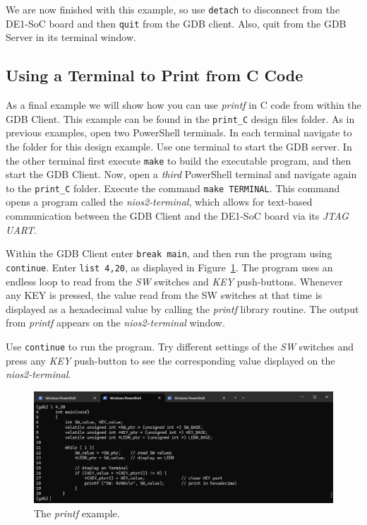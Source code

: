 \documentclass[11pt, twoside, pdftex]{article}
\begin{document}
We are now finished with this example, so use \texttt{detach} to disconnect from the DE1-SoC 
board and then \texttt{quit} from the GDB client. Also, quit from the GDB Server in its 
terminal window. 

\subsection{Using a Terminal to Print from C Code}

As a final example we will show how you can use {\it printf} in C code from within the GDB 
Client.  This example can be found in the \texttt{print\_C} design files folder.
As in previous examples, open two PowerShell terminals. In each terminal 
navigate to the folder for this design example. Use one 
terminal to start the GDB server. In the other terminal first execute \texttt{make} to
build the executable program, and then start the GDB Client.
Now, open a {\it third} PowerShell terminal and navigate again to the \texttt{print\_C} folder.
Execute the command \texttt{make TERMINAL}. This command opens a program called the
{\it nios2-terminal}, which allows for text-based communication between the GDB Client and 
the DE1-SoC board via its {\it JTAG UART}.

Within the GDB Client enter \texttt{break main}, and then run the program using \texttt{continue}.
Enter \texttt{list 4,20}, as displayed in Figure~\ref{fig:print_C1}. The program uses an
endless loop to read from the {\it SW} switches and {\it KEY} push-buttons. Whenever any
KEY is pressed, the value read from the SW switches at that time is displayed as a
hexadecimal value by calling the {\it printf} library routine. The output from {\it printf}
appears on the {\it nios2-terminal} window. 

Use \texttt{continue} to run the program. Try different settings of the {\it SW} switches
and press any {\it KEY} push-button to see the corresponding value displayed on the 
{\it nios2-terminal}.

\begin{figure}[h]
    \begin{center}
        \includegraphics[scale=.6]{figures/print_C1.png}
        \caption{The {\it printf} example.}
        \label{fig:print_C1}
    \end{center}
\end{figure}
\end{document}
